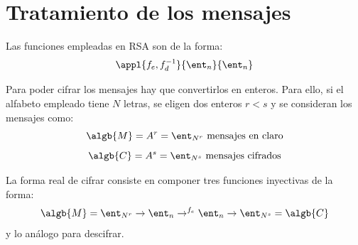 \section{Tratamiento de los mensajes}
Las funciones empleadas en RSA son de la forma:
\[\appl{f_e,f_d^{-1}}{\ent_n}{\ent_n}\]

Para poder cifrar los mensajes hay que convertirlos en enteros. Para ello, si el alfabeto empleado tiene $N$ letras, se eligen dos enteros $r<s$ y se consideran los mensajes como:
\[\algb{M} = A^r = \ent_{N^r} \text{ mensajes en claro}\]
\[\algb{C} = A^s = \ent_{N^s} \text{ mensajes cifrados}\]

La forma real de cifrar consiste en componer tres funciones inyectivas de la forma:
\[\algb{M} = \ent_{N^r} \to \ent_n \to^{f_e} \ent_n \to \ent_{N^s} = \algb{C}\]
y lo análogo para descifrar.

